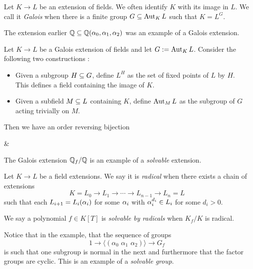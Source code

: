 \documentclass{article}
\begin{document}
\begin{dfn}

  Let $K \to L$ be an extension of fields.
  We often identify $K$ with its image in $L$.
  We call it \emph{Galois} when there is a finite group $G \subseteq \operatorname{Aut}_K L$
  such that $K = L^G$. 
\end{dfn}
The extension earlier $\mathbb{Q} \subseteq \mathbb{Q}(\alpha_0 , \alpha_1 , \alpha_2)$ was an example
of a Galois extension.
\begin{prop}

  Let $K \to L$ be a Galois extension of fields
  and let $G := \operatorname{Aut}_K L$.
  Consider the following two constructions : 
  \begin{itemize}
    \item Given a subgroup $H \subseteq G$,
    define $L^H$ as the set of fixed points of $L$ by $H$.
    This defines a field containing the image of $K$.
    \item Given a subfield $M \subseteq L$ containing $K$,
    define $\operatorname{Aut}_M L$ as the subgroup of $G$ acting trivially on $M$.
  \end{itemize}
  Then we have an order reversing bijection \begin{cd}
    {} & {}
    \arrow["{\mathrm{Aut}_\_ L}", shift left=3, from=1-1, to=1-2]
    \arrow["\simeq"{description}, draw=none, from=1-1, to=1-2]
    \arrow["{L^\_}", shift left=3, from=1-2, to=1-1]
  \end{cd}
\end{prop}
The Galois extension $\mathbb{Q}_f / \mathbb{Q}$ is an example of a \emph{solvable} extension.
\begin{dfn}

  Let $K \to L$ be a field extensions.
  We say it is \emph{radical} when
  there exists a chain of extensions 
  \[
    K = L_0 \to L_1 \to \cdots \to L_{n-1} \to L_n = L
  \]
  such that each $L_{i+1} = L_i(\alpha_i)$
  for some $\alpha_i$ with $\alpha_i^{d_i} \in L_i$ for some $d_i > 0$.

  We say a polynomial $f \in K[T]$ is \emph{solvable by radicals}
  when $K_f / K$ is radical.
\end{dfn}

Notice that in the example, that the sequence of groups 
\[
  1 \to \langle(\alpha_0 \,\,\alpha_1 \,\,\alpha_2)\rangle \to G_f
\]
is such that one subgroup is normal in the next
and furthermore that the factor groups are cyclic.
This is an example of a \emph{solvable group}.
\end{document}
